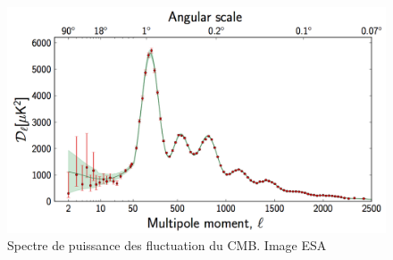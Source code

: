 
%
%
%
%
%
%


\begin{figure}
        \includegraphics[width=.95\linewidth]{img/01/CMB_power_spectrum.png} 
        \caption[Spectre de puissance des fluctuation du CMB]{Spectre de puissance des fluctuation du \ac{CMB}.
        Image ESA}
 		\label{fig:cmb_power_spectrum}
\end{figure}

